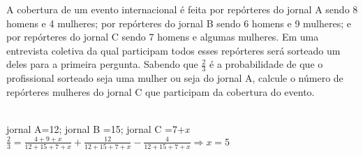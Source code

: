 \begin{ex}
A cobertura de um evento internacional é feita por repórteres do jornal A sendo 8 homens e 4 mulheres; por repórteres do jornal B sendo 6 homens e 9 mulheres; e por repórteres do jornal C sendo 7 homens e algumas mulheres. Em uma entrevista coletiva da qual participam todos esses repórteres será sorteado um deles para a primeira pergunta. Sabendo que $\frac{2}{3}$ é a probabilidade de que o profissional sorteado seja uma mulher ou seja do jornal A, calcule o número de repórteres mulheres do jornal C que participam da cobertura do evento.
  \begin{sol}
   \phantom{A} \\
   jornal A=12;\hspace{0,2cm} jornal B =15;\hspace{0,2cm} jornal C =7+\textit{x} \\
   $\frac{2}{3}=\frac{4+9+x}{12+15+7+x}+\frac{12}{12+15+7+x}-\frac{4}{12+15+7+x} \Longrightarrow x=5$
  \end{sol}
\end{ex}